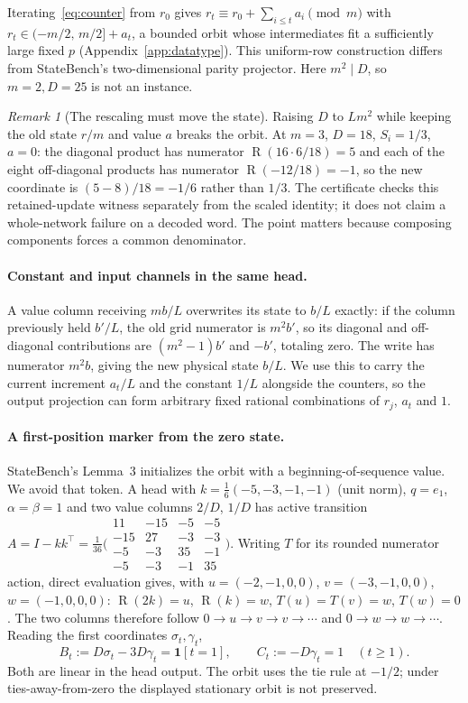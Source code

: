\documentclass[10pt]{article}
\theoremstyle{remark}
\newtheorem*{remark}{Remark}
\DeclareMathOperator{\R}{R}
\begin{document}
Iterating~\eqref{eq:counter} from $r_0$ gives $r_t\equiv r_0+\sum_{i\le t}a_i \pmod m$ with $r_t\in(-m/2,\,m/2]+a_t$, a bounded orbit whose intermediates fit a sufficiently large fixed $p$
(Appendix~\ref{app:datatype}). This uniform-row construction differs from StateBench's two-dimensional
parity projector. Here $m^2\mid D$, so $m=2,D=25$ is not an instance.

\begin{remark}[The rescaling must move the state]
Raising $D$ to $Lm^2$ while keeping the old state $r/m$ and value $a$ breaks the orbit. At $m=3$, $D=18$, $S_i=1/3$, $a=0$: the diagonal product has numerator $\R(16\cdot6/18)=5$ and each of the eight off-diagonal products has numerator $\R(-12/18)=-1$, so the new coordinate is $(5-8)/18=-1/6$ rather than $1/3$. The certificate checks this retained-update witness separately from the
scaled identity; it does not claim a whole-network failure on a decoded word. The point matters because composing components forces a common denominator.
\end{remark}

\paragraph{Constant and input channels in the same head.} A value column receiving $mb/L$ overwrites its state to $b/L$ exactly: if the column previously held $b'/L$, the old grid numerator is $m^2b'$, so its diagonal and off-diagonal
contributions are $(m^2-1)b'$ and $-b'$, totaling zero. The write has numerator
$m^2b$, giving the new physical state $b/L$. We use this to carry the current increment $a_t/L$ and the constant $1/L$ alongside the counters, so the output projection can form arbitrary fixed rational combinations of $r_j$, $a_t$ and $1$.

\paragraph{A first-position marker from the zero state.} StateBench's Lemma~3 initializes the orbit with a beginning-of-sequence value. We avoid that token. A head with $k=\tfrac16(-5,-3,-1,-1)$ (unit norm), $q=e_1$, $\alpha=\beta=1$ and two value columns $2/D$, $1/D$ has active transition $A=I-kk^\top=\tfrac1{36}\big(\begin{smallmatrix}11&-15&-5&-5\\-15&27&-3&-3\\-5&-3&35&-1\\-5&-3&-1&35\end{smallmatrix}\big)$. Writing $T$ for its rounded numerator action, direct evaluation gives, with $u=(-2,-1,0,0)$, $v=(-3,-1,0,0)$, $w=(-1,0,0,0)$: $\R(2k)=u$, $\R(k)=w$, $T(u)=T(v)=w$, $T(w)=0$. The two columns therefore follow $0\to u\to v\to v\to\cdots$ and $0\to w\to w\to\cdots$. Reading the first coordinates $\sigma_t,\gamma_t$,
\[
B_t:=D\sigma_t-3D\gamma_t=\mathbf 1[t=1],\qquad C_t:=-D\gamma_t=1\quad(t\ge1).
\]
Both are linear in the head output. The orbit uses the tie rule at $-1/2$; under ties-away-from-zero the displayed stationary orbit is not preserved.
\end{document}
